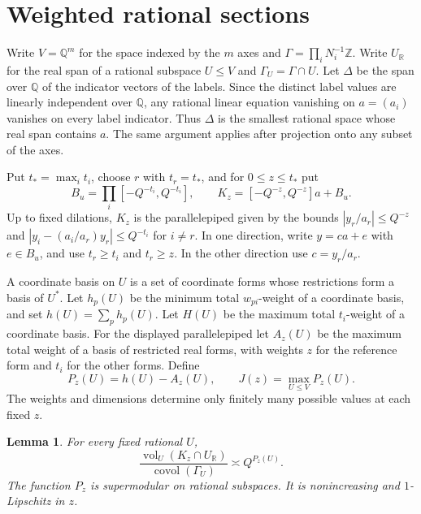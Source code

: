 \documentclass[11pt,reqno,a4paper]{amsart}
\newtheorem{lemma}[theorem]{Lemma}
\theoremstyle{remark}
\numberwithin{equation}{section}
\begin{document}
\section{Weighted rational sections}\label{sec:weighted-sections}

Write $V=\mathbb Q^m$ for the space indexed by the $m$ axes and
$\Gamma=\prod_i N_i^{-1}\mathbb Z$. Write $U_{\mathbb R}$ for the real
span of a rational subspace $U\le V$ and $\Gamma_U=\Gamma\cap U$.
Let $\Delta$ be the span over $\mathbb Q$ of the indicator vectors of
the labels. Since the distinct label values are linearly independent
over $\mathbb Q$, any rational linear equation vanishing on $a=(a_i)$
vanishes on every label indicator. Thus $\Delta$ is the smallest
rational space whose real span contains $a$. The same argument applies
after projection onto any subset of the axes.

Put $t_*=\max_i t_i$, choose $r$ with $t_r=t_*$, and for
$0\le z\le t_*$ put
\[
 B_u=\prod_i[-Q^{-t_i},Q^{-t_i}],\qquad
 K_z=[-Q^{-z},Q^{-z}]a+B_u.
\]
Up to fixed dilations, $K_z$ is the parallelepiped given by the bounds
$|y_r/a_r|\le Q^{-z}$ and
$|y_i-(a_i/a_r)y_r|\le Q^{-t_i}$ for $i\ne r$. In one direction, write
$y=ca+e$ with $e\in B_u$, and use $t_r\ge t_i$ and $t_r\ge z$. In the
other direction use $c=y_r/a_r$.

A coordinate basis on $U$ is a set of coordinate forms whose
restrictions form a basis of $U^*$. Let $h_p(U)$ be the minimum total
$w_{pi}$-weight of a coordinate basis, and set
$h(U)=\sum_p h_p(U)$. Let $H(U)$ be the maximum total $t_i$-weight of a
coordinate basis. For the displayed parallelepiped let $A_z(U)$ be
the maximum total weight of a basis of restricted real forms, with
weights $z$ for the reference form and $t_i$ for the other forms.
Define
\[
 P_z(U)=h(U)-A_z(U),\qquad
 J(z)=\max_{U\le V}P_z(U).
\]
The weights and dimensions determine only finitely many possible
values at each fixed $z$.

\begin{lemma}\label{lem:section-volume}
For every fixed rational $U$,
\begin{equation}\label{eq:core-volume}
 \frac{\operatorname{vol}_{U}(K_z\cap U_{\mathbb R})}
      {\operatorname{covol}(\Gamma_U)}
 \asymp Q^{P_z(U)}.
\end{equation}
The function $P_z$ is supermodular on rational subspaces. It is
nonincreasing and $1$-Lipschitz in $z$.
\end{lemma}
\end{document}
